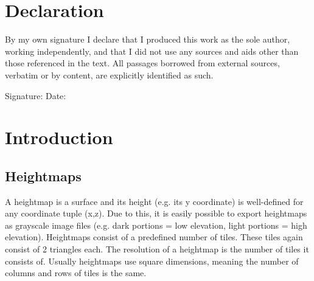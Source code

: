 \documentclass[11pt,a4paper,twoside,openright]{report}
\begin{document}

\tableofcontents
\listoffigures
\listoftables


\chapter*{Declaration}
By my own signature I declare that I produced this work as the sole author, working independently,
and that I did not use any sources and aids other than those referenced in the text.
All passages borrowed from external sources, verbatim or by content, are explicitly identified as
such.\\

\vspace{15mm}

\noindent Signature: \underline{\hspace{5cm}} \hspace{1cm}  Date: \underline{\hspace{5cm}}


\chapter{Introduction}
\label{sec:intro}

\pagestyle{fancy}

\section{Heightmaps}
A heightmap is a surface and its height (e.g. its y coordinate) is well-defined for any coordinate tuple (x,z). Due to this, it is easily possible to export heightmaps as grayscale image files (e.g. dark portions = low elevation, light portions = high elevation). Heightmaps consist of a predefined number of tiles. These tiles again consist of 2 triangles each. The resolution of a heightmap is the number of tiles it consists of. Usually heightmaps use square dimensions, meaning the number of columns and rows of tiles is the same.
\end{document}
